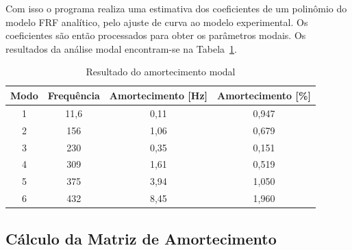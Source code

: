 Com isso o programa realiza uma estimativa dos coeficientes de um polinômio do
modelo FRF analítico, pelo ajuste de curva ao modelo experimental.
% 
Os coeficientes são então processados para obter os parâmetros modais. Os
resultados da análise modal encontram-se na
Tabela~\ref{tab::resultado_modal}.
%
\begin{table}[h]
\centering
\caption{Resultado do amortecimento modal}
\label{tab::resultado_modal}
\begin{tabular}{@{}cccc@{}}
\toprule
Modo & Frequência & Amortecimento {[}Hz{]} & Amortecimento {[}\%{]} \\ \hline
1    & 11,6       & 0,11                   & 0,947                  \\
2    & 156        & 1,06                   & 0,679                  \\
3    & 230        & 0,35                   & 0,151                  \\
4    & 309        & 1,61                   & 0,519                  \\
5    & 375        & 3,94                   & 1,050                  \\
6    & 432        & 8,45                   & 1,960                  \\ \hline
\end{tabular}
\end{table}
%

% 


\subsection{Cálculo da Matriz de Amortecimento}

